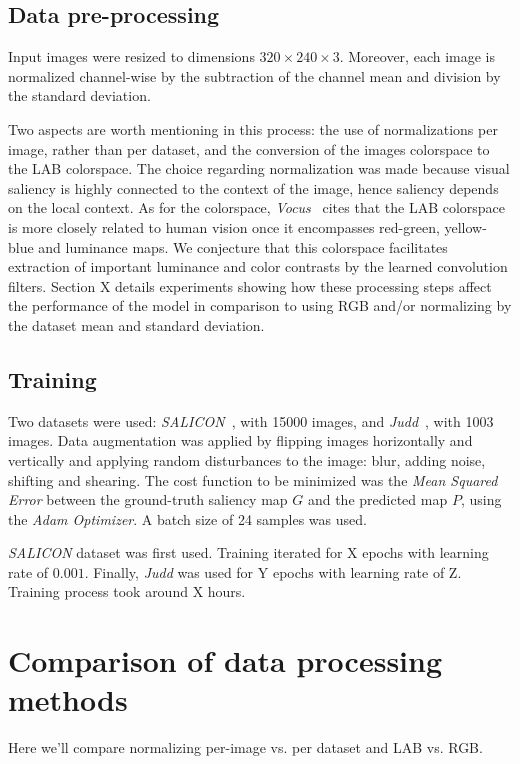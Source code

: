 \documentclass[10pt,twocolumn,letterpaper]{article}
\begin{document}
\subsection{Data pre-processing}
Input images were resized to dimensions $320\times240\times3$.
Moreover, each image is normalized channel-wise by the subtraction of
the channel mean and division by the standard deviation.

Two aspects are worth mentioning in this process:
the use of normalizations per image, rather than per dataset,
and the conversion of the images colorspace to the LAB colorspace.
The choice regarding normalization was made because visual saliency is highly
connected to the context of the image, hence saliency depends on the local
context.
As for the colorspace, \emph{Vocus}~\cite{frintrop_2005} cites that the
LAB colorspace is more closely related to human vision once it encompasses
red-green, yellow-blue and
luminance maps.
We conjecture that this colorspace facilitates extraction of
important luminance and color contrasts by the learned convolution filters.
Section X details experiments showing how these processing steps affect
the performance of the model in comparison to using RGB and/or normalizing
by the dataset mean and standard deviation.

\subsection{Training}
Two datasets were used:
\emph{SALICON}~\cite{jiang_2015}, with 15000 images, and
\emph{Judd}~\cite{judd}, with 1003 images.
Data augmentation was applied by flipping images
horizontally and vertically and applying random disturbances to the image:
blur, adding noise, shifting and shearing.
The cost function to be minimized was the \emph{Mean Squared Error} between
the ground-truth saliency map $G$ and the predicted map $P$, using
the \emph{Adam Optimizer}.
A batch size of 24 samples was used.

\emph{SALICON} dataset was first used.
Training iterated for X epochs with learning rate of $0.001$.
Finally, \emph{Judd} was used for Y epochs with learning rate of Z.
Training process took around X hours.

\section{Comparison of data processing methods}
Here we'll compare normalizing per-image vs. per dataset and LAB vs. RGB.
\end{document}
